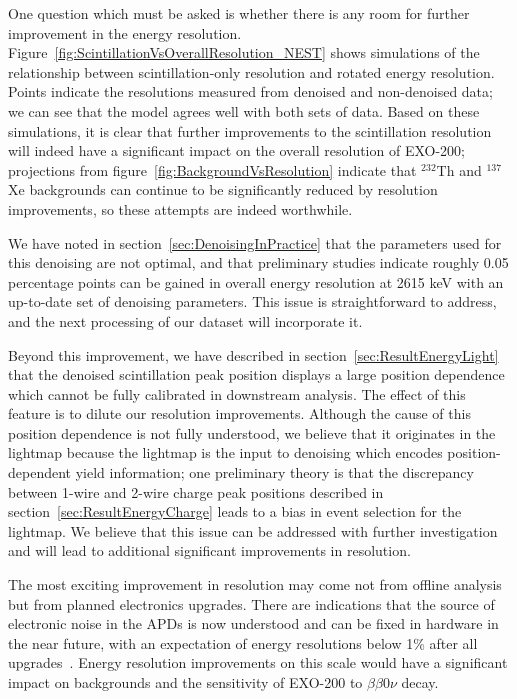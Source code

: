 One question which must be asked is whether there is any room for further improvement in the energy resolution.  Figure~\ref{fig:ScintillationVsOverallResolution_NEST} shows simulations of the relationship between scintillation-only resolution and rotated energy resolution.  Points indicate the resolutions measured from denoised and non-denoised data; we can see that the model agrees well with both sets of data.  Based on these simulations, it is clear that further improvements to the scintillation resolution will indeed have a significant impact on the overall resolution of EXO-200; projections from figure~\ref{fig:BackgroundVsResolution} indicate that $^{232}$Th and $^{137}$Xe backgrounds can continue to be significantly reduced by resolution improvements, so these attempts are indeed worthwhile.

We have noted in section~\ref{sec:DenoisingInPractice} that the parameters used for this denoising are not optimal, and that preliminary studies indicate roughly 0.05 percentage points can be gained in overall energy resolution at 2615 keV with an up-to-date set of denoising parameters.  This issue is straightforward to address, and the next processing of our dataset will incorporate it.

Beyond this improvement, we have described in section~\ref{sec:ResultEnergyLight} that the denoised scintillation peak position displays a large position dependence which cannot be fully calibrated in downstream analysis.  The effect of this feature is to dilute our resolution improvements.  Although the cause of this position dependence is not fully understood, we believe that it originates in the lightmap because the lightmap is the input to denoising which encodes position-dependent yield information; one preliminary theory is that the discrepancy between 1-wire and 2-wire charge peak positions described in section~\ref{sec:ResultEnergyCharge} leads to a bias in event selection for the lightmap.  We believe that this issue can be addressed with further investigation and will lead to additional significant improvements in resolution.

The most exciting improvement in resolution may come not from offline analysis but from planned electronics upgrades.  There are indications that the source of electronic noise in the APDs is now understood and can be fixed in hardware in the near future, with an expectation of energy resolutions below 1\% after all upgrades~\cite{ElectronicsUpgradeReport_March2014}.  Energy resolution improvements on this scale would have a significant impact on backgrounds and the sensitivity of EXO-200 to $\beta\beta 0\nu$ decay.

